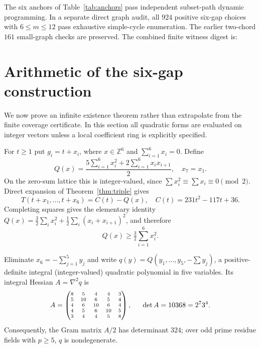 \documentclass[9pt,a4paper,twocolumn]{extarticle}
\begin{document}
The six anchors of Table~\ref{tab:anchors} pass independent subset-path dynamic programming. In a separate direct graph audit, all $924$ positive six-gap choices with $6\le m\le12$ pass exhaustive simple-cycle enumeration. The earlier two-chord $161$ small-graph checks are preserved. The combined finite witness digest is:
\begin{quote}\ttfamily\footnotesize\raggedright
{}
\end{quote}




\section{Arithmetic of the six-gap construction}
We now prove an infinite existence theorem rather than extrapolate from the finite coverage certificate. In this section all quadratic forms are evaluated on integer vectors unless a local coefficient ring is explicitly specified.

For $t\geq1$ put $g_i=t+x_i$, where $x\in\mathbb Z^6$ and $\sum_{i=1}^6x_i=0$. Define
\begin{equation}\label{eq:defQ}
Q(x)=\frac{5\sum_{i=1}^6x_i^2+2\sum_{i=1}^6x_ix_{i+1}}{2},\quad x_7=x_1.
\end{equation}
On the zero-sum lattice this is integer-valued, since $\sum x_i^2\equiv\sum x_i\equiv0\pmod2$. Direct expansion of Theorem~\ref{thm:triple} gives
\begin{equation}\label{eq:center}
T(t+x_1,\ldots,t+x_6)=C(t)-Q(x),\quad C(t)=231t^2-117t+36.
\end{equation}
Completing squares gives the elementary identity $Q(x)=\tfrac32\sum_i x_i^2+\tfrac12\sum_i(x_i+x_{i+1})^2$, and therefore
\begin{equation}\label{eq:norm}
Q(x)\geq\tfrac32\sum_{i=1}^6x_i^2.
\end{equation}

Eliminate $x_6=-\sum_{j=1}^{5}y_j$ and write $q(y)=Q(y_1,\ldots,y_5,-\sum y_j)$, a positive-definite integral (integer-valued) quadratic polynomial in five variables. Its integral Hessian $A=\nabla^2q$ is
\begin{equation}\label{eq:A}
\scriptsize
A=\begin{pmatrix}
8&5&4&4&3\\
5&10&6&5&4\\
4&6&10&6&4\\
4&5&6&10&5\\
3&4&4&5&8
\end{pmatrix},\qquad \det A=10368=2^7 3^4.
\end{equation}
\normalsize
Consequently, the Gram matrix $A/2$ has determinant $324$; over odd prime residue fields with $p\geq5$, $q$ is nondegenerate.
\end{document}
